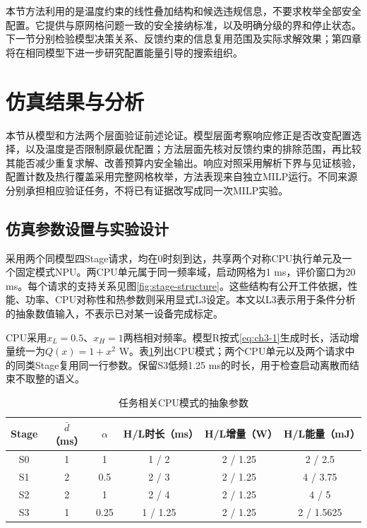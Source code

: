 本节方法利用的是温度约束的线性叠加结构和候选违规信息，不要求枚举全部安全配置。它提供与原网格问题一致的安全接纳标准，以及明确分级的界和停止状态。下一节分别检验模型决策关系、反馈约束的信息复用范围及实际求解效果；第四章将在相同模型下进一步研究配置能量引导的搜索组织。

\section{仿真结果与分析}

本节从模型和方法两个层面验证前述论证。模型层面考察响应修正是否改变配置选择，以及温度是否限制原最优配置；方法层面先核对反馈约束的排除范围，再比较其能否减少重复求解、改善预算内安全输出。响应对照采用解析下界与见证核验，配置计数及热行覆盖采用完整网格枚举，方法表现来自独立MILP运行。不同来源分别承担相应验证任务，不将已有证据改写成同一次MILP实验。

\subsection{仿真参数设置与实验设计}

采用两个同模型四Stage请求，均在0时刻到达，共享两个对称CPU执行单元及一个固定模式NPU。两CPU单元属于同一频率域，启动网格为1 ms，评价窗口为20 ms。每个请求的支持关系见图\ref{fig:stage-structure}。这些结构有公开工件依据，性能、功率、CPU对称性和热参数则采用显式L3设定。本文以L3表示用于条件分析的抽象数值输入，不表示已对某一设备完成标定。

CPU采用\(x_L=0.5\)、\(x_H=1\)两档相对频率。模型R按式\eqref{eq:ch3-1}生成时长，活动增量统一为\(Q(x)=1+x^2\) W。表\ref{tab:modes}列出CPU模式；两个CPU单元以及两个请求中的同类Stage复用同一行参数。保留S3低频1.25 ms的时长，用于检查启动离散而结束不取整的语义。

\begin{table}[htbp]
\centering\small
\caption{任务相关CPU模式的抽象参数}\label{tab:modes}
\begin{tabular}{cccccc}
\toprule
Stage & $\bar d$（ms） & $\alpha$ & H/L时长（ms） & H/L增量（W） & H/L能量（mJ）\\
\midrule
S0 & 1 & 1 & 1 / 2 & 2 / 1.25 & 2 / 2.5\\
S1 & 2 & 0.5 & 2 / 3 & 2 / 1.25 & 4 / 3.75\\
S2 & 2 & 1 & 2 / 4 & 2 / 1.25 & 4 / 5\\
S3 & 1 & 0.25 & 1 / 1.25 & 2 / 1.25 & 2 / 1.5625\\
\bottomrule
\end{tabular}
\end{table}

